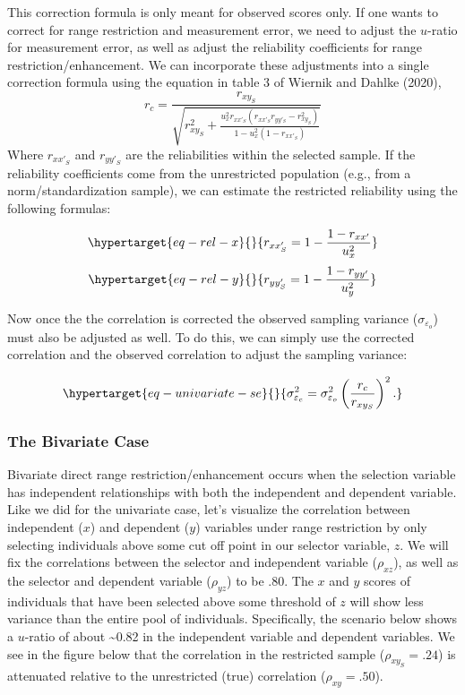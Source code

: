 \documentclass[
  letterpaper,
  DIV=11,
  numbers=noendperiod]{scrreprt}
\begin{document}
This correction formula is only meant for observed scores only. If one
wants to correct for range restriction and measurement error, we need to
adjust the \(u\)-ratio for measurement error, as well as adjust the
reliability coefficients for range restriction/enhancement. We can
incorporate these adjustments into a single correction formula using the
equation in table 3 of Wiernik and Dahlke (2020), \[
r_c=\frac{r_{xy_S}}{\sqrt{r_{xy_S}^2 + \frac{u_{x}^2 r_{xx'_S}\left(r_{xx'_S}r_{yy'_S} - r_{xy_S}^2\right) }{1 - u_{x}^2 \left(1-r_{xx'_S}\right)} }}
\] Where \(r_{xx'_S}\) and \(r_{yy'_S}\) are the reliabilities within
the selected sample. If the reliability coefficients come from the
unrestricted population (e.g., from a norm/standardization sample), we
can estimate the restricted reliability using the following formulas:

\begin{equation}\protect\hypertarget{eq-rel-x}{}{
r_{xx'_S} = 1-\frac{1-r_{xx'}}{u_x^2}
}\label{eq-rel-x}\end{equation}
\begin{equation}\protect\hypertarget{eq-rel-y}{}{
r_{yy'_S} = 1-\frac{1-r_{yy'}}{u_y^2}
}\label{eq-rel-y}\end{equation}

Now once the the correlation is corrected the observed sampling variance
(\(\sigma_{\varepsilon_o}\)) must also be adjusted as well. To do this,
we can simply use the corrected correlation and the observed correlation
to adjust the sampling variance:

\begin{equation}\protect\hypertarget{eq-univariate-se}{}{
\sigma^2_{\varepsilon_c} = \sigma^2_{\varepsilon_o}\left(\frac{r_c}{r_{xy_S}}\right)^2.
}\label{eq-univariate-se}\end{equation}

\hypertarget{the-bivariate-case-2}{%
\subsubsection*{The Bivariate Case}\label{the-bivariate-case-2}}

Bivariate direct range restriction/enhancement occurs when the selection
variable has independent relationships with both the independent and
dependent variable. Like we did for the univariate case, let's visualize
the correlation between independent (\(x\)) and dependent (\(y\))
variables under range restriction by only selecting individuals above
some cut off point in our selector variable, \(z\). We will fix the
correlations between the selector and independent variable
(\(\rho_{xz}\)), as well as the selector and dependent variable
(\(\rho_{yz}\)) to be .80. The \(x\) and \(y\) scores of individuals
that have been selected above some threshold of \(z\) will show less
variance than the entire pool of individuals. Specifically, the scenario
below shows a \(u\)-ratio of about \textasciitilde0.82 in the
independent variable and dependent variables. We see in the figure below
that the correlation in the restricted sample (\(\rho_{xy_S}=.24\)) is
attenuated relative to the unrestricted (true) correlation
(\(\rho_{xy}=.50\)).
\end{document}
